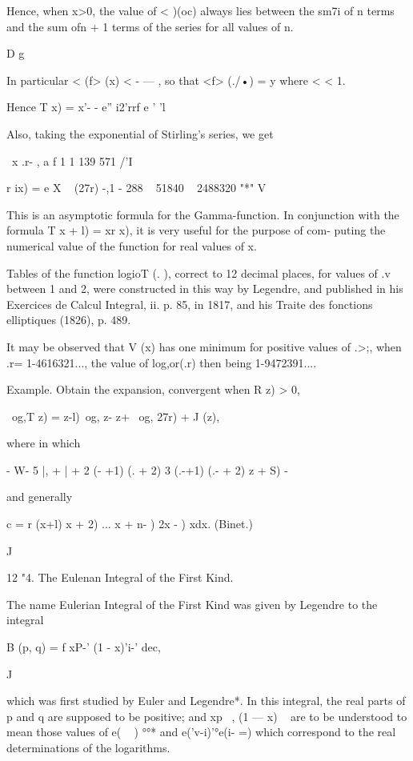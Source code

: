 Hence, when x>0, the value of < )(oc) always lies between the sm7i of
n terms and the sum ofn + 1 terms of the series for all values of n.

D g

In particular < (f> (x) < - — , so that <f> (./•) = y where < < 1.

Hence T x) = x'- - e'' i2'rrf e ' 'l

Also, taking the exponential of Stirling's series, we get

\ x .r- , a f 1 1 139 571 /'I

r ix) = e X ~ (27r) -,1 - 288 ~ 51840 ~ 2488320 "*" V

This is an asymptotic formula for the Gamma-function. In conjunction
with the formula T x + l) = xr x), it is very useful for the purpose
of com- puting the numerical value of the function for real values of
x.

Tables of the function logioT (. ), correct to 12 decimal places, for
values of .v between 1 and 2, were constructed in this way by
Legendre, and published in his Exercices de Calcul Integral, ii. p.
85, in 1817, and his Traite des fonctions elliptiques (1826), p. 489.

It may be observed that V (x) has one minimum for positive values of
.>;, when .r= 1-4616321..., the value of log,or(.r) then being
1-9472391....

Example. Obtain the expansion, convergent when R z) > 0,

\ og,T z) = z-l)\ og, z- z+ \ og, 27r) + J (z),



where in which



- W- 5 |, + | + 2 (- +1) (. + 2) 3 (.-+1) (.- + 2) z + S) -



and generally

c = r (x+l) x + 2) ... x + n- ) 2x - ) xdx. (Binet.)

J

12 "4. The Eulenan Integral of the First Kind.

The name Eulerian Integral of the First Kind was given by Legendre to
the integral

B (p, q) = f xP-' (1 - x)'i-' dec,

J

which was first studied by Euler and Legendre*. In this integral, the
real parts of p and q are supposed to be positive; and xp~ , (1 — x) ~
are to be understood to mean those values of e( ~ ) °°* and
e('v-i)'°e(i- =) which correspond to the real determinations of the
logarithms.

